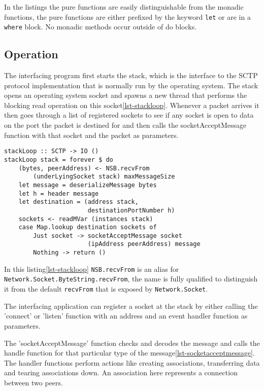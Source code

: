 In the listings the pure functions are easily distinguishable from the monadic functions, the pure functions are either prefixed by the keyword \lstinline{let} or are in a \lstinline{where} block. No monadic methods occur outside of do blocks.

\subsection{Operation}
The interfacing program first starts the stack, which is the interface to the SCTP protocol implementation that is normally run by the operating system. The stack opens an operating system socket and spawns a new thread that performs the blocking read operation on this socket\ref{lst-stackloop}. Whenever a packet arrives it then goes through a list of registered sockets to see if any socket is open to data on the port the packet is destined for and then calls the socketAcceptMessage function with that socket and the packet as parameters.

\begin{lstlisting}[caption={The stack loop},label={lst-stackloop}]
stackLoop :: SCTP -> IO ()
stackLoop stack = forever $ do
    (bytes, peerAddress) <- NSB.recvFrom 
        (underLyingSocket stack) maxMessageSize
    let message = deserializeMessage bytes
    let h = header message
    let destination = (address stack,
                       destinationPortNumber h)
    sockets <- readMVar (instances stack)
    case Map.lookup destination sockets of
        Just socket -> socketAcceptMessage socket
                       (ipAddress peerAddress) message
        Nothing -> return ()
\end{lstlisting}

In this listing\ref{lst-stackloop} \lstinline{NSB.recvFrom} is an alias for \lstinline{Network.Socket.ByteString.recvFrom}, the name is fully qualified to distinguish it from the default \lstinline{recvFrom} that is exposed by \lstinline{Network.Socket}.

The interfacing application can register a socket at the stack by either calling the 'connect' or 'listen' function with an address and an event handler function as parameters.

The 'socketAcceptMessage' function checks and decodes the message and calls the handle function for that particular type of the message\ref{lst-socketacceptmessage}. The handler functions perform actions like creating associations, transferring data and tearing associations down. An association here represents a connection between two peers.

